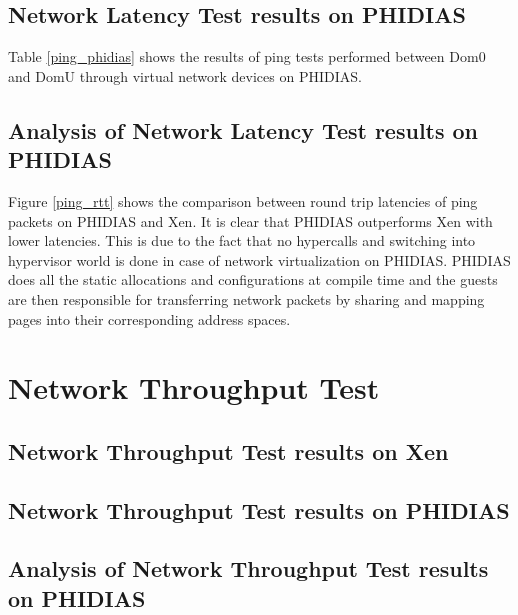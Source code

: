 \subsection{Network Latency Test results on PHIDIAS \label{sec:testlatencyphidias}}
Table \ref{ping_phidias} shows the results of ping tests performed between Dom0 and DomU through virtual network devices on PHIDIAS.

\begin{table}[htbp]
	\caption{Ping Test Results on PHIDIAS}
	 \centering
	\label{ping_phidias}
\end{table}

\subsection{Analysis of Network Latency Test results on PHIDIAS \label{sec:testlatencyeval}}

Figure \ref{ping_rtt} shows the comparison between round trip latencies of ping packets on PHIDIAS and Xen. It is clear that PHIDIAS outperforms Xen with lower latencies. This is due to the fact that no hypercalls and switching into hypervisor world is done in case of network virtualization on PHIDIAS. PHIDIAS does all the static allocations and configurations at compile time and the guests are then responsible for transferring network packets by sharing and mapping pages into their corresponding address spaces.


\section{Network Throughput Test \label{sec:testenvthrough}}

\subsection{Network Throughput Test results on Xen \label{sec:testthroughxen}}

\subsection{Network Throughput Test results on PHIDIAS \label{sec:testthroughphidias}}

\subsection{Analysis of Network Throughput Test results on PHIDIAS \label{sec:testthrougheval}}